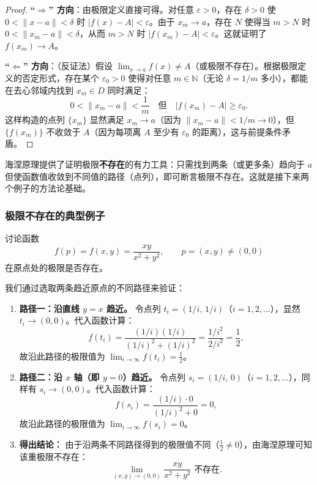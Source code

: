 \documentclass[lang=cn,11pt]{elegantbook}
\begin{document}
\begin{proof}
\textbf{``$\Rightarrow$'' 方向}：由极限定义直接可得。对任意 $\varepsilon>0$，存在 $\delta>0$ 使 $0<\|x-a\|<\delta$ 时 $|f(x)-A|<\varepsilon$。由于 $x_m\to a$，存在 $N$ 使得当 $m>N$ 时 $0<\|x_m-a\|<\delta$，从而 $m>N$ 时 $|f(x_m)-A|<\varepsilon$。这就证明了 $f(x_m) \to A$。

\textbf{``$\Leftarrow$'' 方向}：（反证法）假设 $\displaystyle\lim_{x\to a}f(x) \neq A$（或极限不存在）。根据极限定义的否定形式，存在某个 $\varepsilon_0>0$ 使得对任意 $m\in\mathbb{N}$（无论 $\delta = 1/m$ 多小），都能在去心邻域内找到 $x_m\in D$ 同时满足：
\[
0<\|x_m-a\|<\frac1m\quad\text{但}\quad |f(x_m)-A|\geq\varepsilon_0.
\]
这样构造的点列 $\{x_m\}$ 显然满足 $x_m\to a$（因为 $\|x_m-a\|<1/m\to 0$），但 $\{f(x_m)\}$ 不收敛于 $A$（因为每项离 $A$ 至少有 $\varepsilon_0$ 的距离），这与前提条件矛盾。
\end{proof}

\begin{note}[海涅原理的应用价值]
海涅原理提供了证明极限\textbf{不存在}的有力工具：只需找到两条（或更多条）趋向于 $a$ 但使函数值收敛到不同值的路径（点列），即可断言极限不存在。这就是接下来两个例子的方法论基础。
\end{note}


\subsubsection{极限不存在的典型例子}

\begin{exercise}[沿不同直线路径极限不同] \label{ex:limit-not-exist-linear}
讨论函数
\[
f(p)=f(x,y)=\frac{xy}{x^2+y^2},\qquad p=(x,y) \neq (0,0)
\]
在原点处的极限是否存在。
\end{exercise}

\begin{solution}
我们通过选取两条趋近原点的不同路径来验证：
\begin{enumerate}
  \item \textbf{路径一：沿直线 $y=x$ 趋近。}
  令点列 $t_i=(1/i,\,1/i)$（$i=1,2,\dots$），显然 $t_i\to(0,0)$。代入函数计算：
  \[
  f(t_i)=\frac{(1/i)(1/i)}{(1/i)^2+(1/i)^2}=\frac{1/i^2}{2/i^2}=\frac12,
  \]
  故沿此路径的极限值为 $\displaystyle\lim_{i\to\infty}f(t_i)=\frac12$。

  \item \textbf{路径二：沿 $x$ 轴（即 $y=0$）趋近。}
  令点列 $s_i=(1/i,\,0)$（$i=1,2,\dots$），同样有 $s_i\to(0,0)$。代入函数计算：
  \[
  f(s_i)=\frac{(1/i)\cdot 0}{(1/i)^2+0}=0,
  \]
  故沿此路径的极限值为 $\displaystyle\lim_{i\to\infty}f(s_i)=0$。

  \item \textbf{得出结论：}
  由于沿两条不同路径得到的极限值不同（$\frac12 \neq 0$），由海涅原理可知该重极限不存在：
  \[
  \boxed{\lim_{(x,y)\to(0,0)}\frac{xy}{x^2+y^2}\text{ 不存在}}.
  \]
\end{enumerate}
\end{solution}
\end{document}
